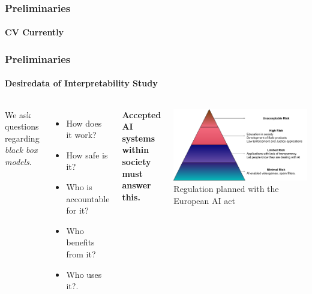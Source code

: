 \begin{frame}[t]
    \frametitle{Preliminaries}
    \framesubtitle{CV Currently}
    
    
\end{frame}
\begin{frame}[t]
    \frametitle{Preliminaries}
    \framesubtitle{Desiredata of Interpretability Study}
    \begin{columns}[c]
        {\footnotesize%
         We ask  questions regarding \emph{black box models}.
         \begin{itemize}
             \item How does it work?
             \item How safe is it?
             \item Who is accountable for it?
             \item Who benefits from it?
             \item Who uses it?.
         \end{itemize}
         \vspace{20pt}
         \textbf{Accepted AI systems within society must answer this.}
        }
        \pause
        \begin{center}
            \includegraphics[width=\textwidth]{fig/rel/common/img/AI_act_pyramid.pdf}      
            \footnotesize Regulation planned with the European AI act\cite{madiega2021artificial}
        \end{center}

    \end{columns}
    
\end{frame}